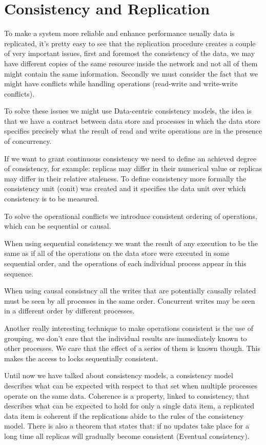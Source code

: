 \chapter{Consistency and Replication}
To make a system more reliable and enhance performance usually data is replicated, it's pretty easy to see that the replication procedure creates a couple of very important issues, first and foremost the consistency of the data, we may have different copies of the same resource inside the network and not all of them might contain the same information. Secondly we must consider the fact that we might have conflicts while handling operations (read-write and write-write conflicts).

To solve these issues we might use Data-centric consistency models, the idea is that we have a contract between data store and processes in which the data store specifies precisely what the result of read and write operations are in the presence of concurrency.

If we want to grant continuous consistency we need to define an achieved degree of consistency, for example: replicas may differ in their numerical value or replicas may differ in their relative staleness. To define consistency more formally the consistency unit (conit) was created and it specifies the data unit over which consistency is to be measured.

To solve the operational conflicts we introduce consistent ordering of operations, which can be sequential or causal.

When using sequential consistency we want the result of any execution to be the same as if all of the operations on the data store were executed in some sequential order, and the operations of each individual process appear in this sequence.

When using causal consistncy all the writes that are potentially causally related must be seen by all processes in the same order. Concurrent writes may be seen in a different order by different processes.

Another really interesting technique to make operations consistent is the use of grouping, we don't care that the individual results are immediately known to other processes. We care that the effect of a series of them is known though. This makes the access to locks sequentially consistent.

Until now we have talked about consistency models, a consistency model describes what can be expected with respect to that set when multiple processes operate on the same data. Coherence is a property, linked to consistency, that describes what can be expected to hold for only a single data item, a replicated data item is coherent if the replications abide to the rules of the consistency model. There is also a theorem that states that: if no updates take place for a long time all replicas will gradually become consistent (Eventual consistency).


